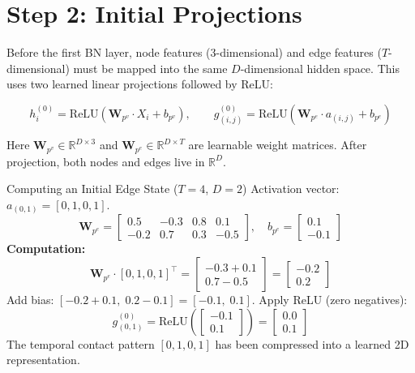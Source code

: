 \section{Step 2: Initial Projections}

Before the first BN layer, node features (3-dimensional) and edge features ($T$-dimensional) must be mapped into the same $D$-dimensional hidden space. This uses two learned linear projections followed by ReLU:

\begin{equation}
h_i^{(0)} = \text{ReLU}\!\left(\mathbf{W}_{p^v} \cdot X_i + b_{p^v}\right), \qquad g_{(i,j)}^{(0)} = \text{ReLU}\!\left(\mathbf{W}_{p^e} \cdot a_{(i,j)} + b_{p^e}\right)
\label{eq:projections}
\end{equation}

Here $\mathbf{W}_{p^v} \in \mathbb{R}^{D \times 3}$ and $\mathbf{W}_{p^e} \in \mathbb{R}^{D \times T}$ are learnable weight matrices. After projection, both nodes and edges live in $\mathbb{R}^D$.

\begin{examplebox}{Computing an Initial Edge State ($T=4$, $D=2$)}
Activation vector: $a_{(0,1)} = [0, 1, 0, 1]$.
\[
\mathbf{W}_{p^e} = \begin{bmatrix} 0.5 & -0.3 & 0.8 & 0.1 \\ -0.2 & 0.7 & 0.3 & -0.5 \end{bmatrix}, \quad b_{p^e} = \begin{bmatrix} 0.1 \\ -0.1 \end{bmatrix}
\]
\textbf{Computation:}
\[
\mathbf{W}_{p^e} \cdot [0,1,0,1]^\top = \begin{bmatrix} -0.3+0.1 \\ 0.7-0.5 \end{bmatrix} = \begin{bmatrix} -0.2 \\ 0.2 \end{bmatrix}
\]
Add bias: $[-0.2+0.1,\; 0.2-0.1] = [-0.1,\; 0.1]$. Apply ReLU (zero negatives):
\[
g_{(0,1)}^{(0)} = \text{ReLU}\!\left(\begin{bmatrix}-0.1\\0.1\end{bmatrix}\right) = \begin{bmatrix}0.0\\0.1\end{bmatrix}
\]
The temporal contact pattern $[0,1,0,1]$ has been compressed into a learned 2D representation.
\end{examplebox}

